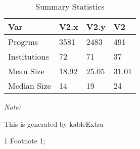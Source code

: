 \begin{table}
\centering
\caption{Summary Statistics}
\centering
\begin{threeparttable}
\begin{tabular}[t]{llll}
\toprule
Var & V2.x & V2.y & V2\\
\midrule
Progrms & 3581 & 2483 & 491\\
Institutions & 72 & 71 & 37\\
Mean Size & 18.92 & 25.05 & 31.01\\
Median Size & 14 & 19 & 24\\
\bottomrule
\end{tabular}
\begin{tablenotes}
\item \textit{Note: } 
\item This is generated by kableExtra
\item[1] Footnote 1; 
\end{tablenotes}
\end{threeparttable}
\end{table}

